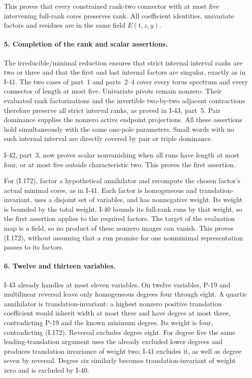 This proves that every constrained rank-two connector with
at most five intervening full-rank cores preserves rank.
All coefficient identities, univariate factors and residues
are in the same field $E(t,z,y)$.

\paragraph{5. Completion of the rank and scalar assertions.}
The irreducible/minimal reduction ensures that strict
internal interval ranks are two or three and that the first
and last internal factors are singular, exactly as in I-41.
The two cases of part~1 and parts~2--4 cover every torus
spectrum and every connector of length at most five.
Univariate pivots remain nonzero. Their evaluated rank
factorizations and the invertible two-by-two adjacent
contractions therefore preserve all strict interval ranks,
as proved in I-43, part~5. Pair dominance supplies the
nonzero active endpoint projections. All these assertions
hold simultaneously with the same one-pole parameters.
Small words with no such internal interval are directly
covered by pair or triple dominance.

I-42, part~3, now proves scalar nonvanishing when all runs
have length at most four, or at most five outside
characteristic two. This proves the first assertion.

For (I.172), factor a hypothetical annihilator and recompute
the chosen factor's actual minimal cores, as in I-41.
Each factor is homogeneous and translation-invariant, uses
a disjoint set of variables, and has nonnegative weight.
Its weight is bounded by the total weight. I-40 bounds its
full-rank runs by that weight, so the first assertion applies
to the required factors. The target of the evaluation map
is a field, so no product of these nonzero images can vanish.
This proves (I.172), without assuming that a run promise
for one nonminimal representation passes to its factors.

\paragraph{6. Twelve and thirteen variables.}
I-43 already handles at most eleven variables. On twelve
variables, P-19 and multilinear reversal leave only
homogeneous degrees four through eight. A quartic
annihilator is translation-invariant: a highest nonzero
positive translation coefficient would inherit width at
most three and have degree at most three, contradicting
P-19 and the known minimum degree. Its weight is four,
contradicting (I.172). Reversal excludes degree eight.
For degree five the same leading-translation argument
uses the already excluded lower degrees and produces
translation invariance of weight two; I-41 excludes it,
as well as degree seven by reversal. Degree six similarly
becomes translation-invariant of weight zero and is
excluded by I-40.

